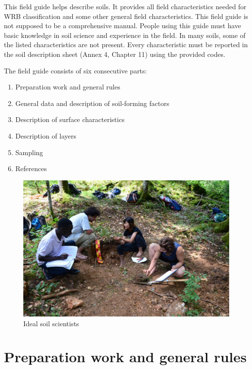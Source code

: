 \documentclass[
  letterpaper,
  DIV=11,
  numbers=noendperiod]{scrreprt}
\providecommand{\tightlist}{%
  \setlength{\itemsep}{0pt}\setlength{\parskip}{0pt}}\usepackage{longtable,booktabs,array}
\begin{document}
This field guide helps describe soils. It provides all field
characteristics needed for WRB classification and some other general
field characteristics. This field guide is not supposed to be a
comprehensive manual. People using this guide must have basic knowledge
in soil science and experience in the field. In many soils, some of the
listed characteristics are not present. Every characteristic must be
reported in the soil description sheet (Annex 4, Chapter 11) using the
provided codes.

The field guide consists of six consecutive parts:

\begin{enumerate}
\def\labelenumi{\arabic{enumi}.}
\tightlist
\item
  Preparation work and general rules
\item
  General data and description of soil-forming factors
\item
  Description of surface characteristics
\item
  Description of layers
\item
  Sampling
\item
  References
\end{enumerate}

\begin{figure}

{\centering \includegraphics{./figure_8-1.png}

}

\caption{Ideal soil scientists}

\end{figure}

\hypertarget{preparation-work-and-general-rules}{%
\section{Preparation work and general
rules}\label{preparation-work-and-general-rules}}
\end{document}
